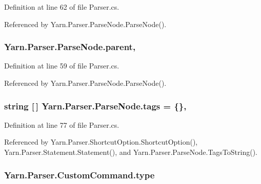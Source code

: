 Definition at line 62 of file Parser.\-cs.



Referenced by Yarn.\-Parser.\-Parse\-Node.\-Parse\-Node().

\hypertarget{a00150_af313a82103fcc2ff5a177dbb06b92f7b}{
\subsubsection[{parent}]{ Yarn.\-Parser.\-Parse\-Node.\-parent\hspace{0.3cm}{\ttfamily [package]}, {\ttfamily [inherited]}}}\label{a00150_af313a82103fcc2ff5a177dbb06b92f7b}


Definition at line 59 of file Parser.\-cs.



Referenced by Yarn.\-Parser.\-Parse\-Node.\-Parse\-Node().

\hypertarget{a00150_a58b3a15788fd2d4127d73619dc6d04ae}{
\subsubsection[{tags}]{\setlength{\rightskip}{0pt plus 5cm}string \mbox{[}$\,$\mbox{]} Yarn.\-Parser.\-Parse\-Node.\-tags = \{\}\hspace{0.3cm}{\ttfamily [package]}, {\ttfamily [inherited]}}}\label{a00150_a58b3a15788fd2d4127d73619dc6d04ae}


Definition at line 77 of file Parser.\-cs.



Referenced by Yarn.\-Parser.\-Shortcut\-Option.\-Shortcut\-Option(), Yarn.\-Parser.\-Statement.\-Statement(), and Yarn.\-Parser.\-Parse\-Node.\-Tags\-To\-String().

\hypertarget{a00085_a5ef3bc96812be224d91548bfcdfd4b92}{
\subsubsection[{type}]{ Yarn.\-Parser.\-Custom\-Command.\-type\hspace{0.3cm}{\ttfamily [package]}}}\label{a00085_a5ef3bc96812be224d91548bfcdfd4b92}


